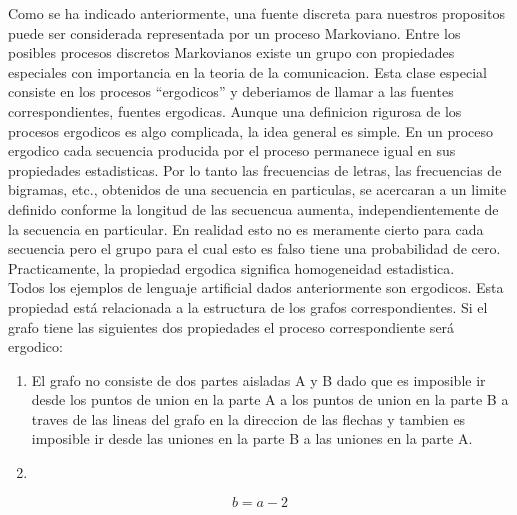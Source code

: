 Como se ha indicado anteriormente, una fuente discreta para nuestros propositos puede ser considerada representada por un proceso Markoviano. Entre los posibles procesos discretos Markovianos existe un grupo con propiedades especiales con importancia en la teoria de la comunicacion. Esta clase especial consiste en los procesos ``ergodicos'' y deberiamos de llamar a las fuentes correspondientes, fuentes ergodicas. Aunque una definicion rigurosa de los procesos ergodicos es algo complicada, la idea general es simple. En un proceso ergodico cada secuencia producida por el proceso permanece igual en sus propiedades estadisticas. Por lo tanto las frecuencias de letras, las frecuencias de bigramas, etc., obtenidos de una secuencia en particulas, se acercaran a un limite definido conforme la longitud de las secuencua aumenta, independientemente de la secuencia en particular. En realidad esto no es meramente cierto para cada secuencia pero el grupo para el cual esto es falso tiene una probabilidad de cero. Practicamente, la propiedad ergodica significa homogeneidad estadistica. \\
Todos los ejemplos de lenguaje artificial dados anteriormente son ergodicos. Esta propiedad está relacionada a la estructura de los grafos correspondientes. Si el grafo tiene las siguientes dos propiedades el proceso correspondiente será ergodico:

\begin{enumerate}
   \item El grafo no consiste de dos partes aisladas A y B dado que es imposible ir desde los puntos de union en la parte A a los puntos de union en la parte B a traves de las lineas del grafo en la direccion de las flechas y tambien es imposible ir desde las uniones en la parte B a las uniones en la parte A. 
   \item 
\end{enumerate}

\begin{equation}
b = a - 2
\end{equation}
